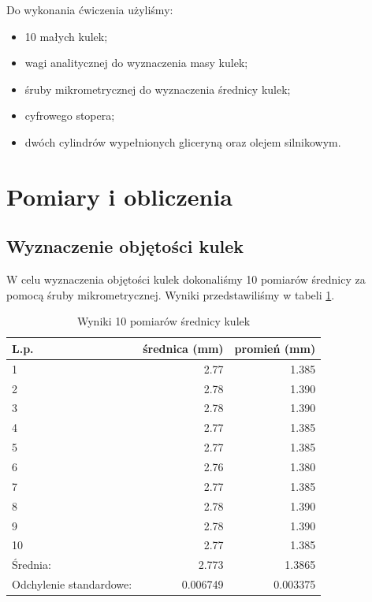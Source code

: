 \documentclass[a4paper]{article}
\begin{document}
Do wykonania ćwiczenia użyliśmy:

\begin{itemize}
	\item 10 małych kulek;
	\item wagi analitycznej do wyznaczenia masy kulek;
	\item śruby mikrometrycznej do wyznaczenia średnicy kulek;
	\item cyfrowego stopera;
	\item dwóch cylindrów wypełnionych gliceryną oraz olejem silnikowym.
\end{itemize}

\section{Pomiary i obliczenia}

\subsection{Wyznaczenie objętości kulek}

W celu wyznaczenia objętości kulek dokonaliśmy 10 pomiarów średnicy za pomocą śruby mikrometrycznej.
Wyniki przedstawiliśmy w tabeli \ref{kulki_srednica}.

\begin{table}[h!]
	\centering
	\begin{tabular}{lrr}
		\toprule
		L.p. &  średnica (mm) &  promień (mm) \\
		\midrule
		1 &           2.77 &         1.385 \\
		2 &           2.78 &         1.390 \\
		3 &           2.78 &         1.390 \\
		4 &           2.77 &         1.385 \\
		5 &           2.77 &         1.385 \\
		6 &           2.76 &         1.380 \\
		7 &           2.77 &         1.385 \\
		8 &           2.78 &         1.390 \\
		9 &           2.78 &         1.390 \\
		10 &           2.77 &         1.385 \\
		\midrule
		Średnia: & 2.773 & 1.3865 \\
		Odchylenie standardowe: & 0.006749 & 0.003375 \\
		\bottomrule
	\end{tabular}
	\caption{Wyniki 10 pomiarów średnicy kulek}
	\label{kulki_srednica}
\end{table}
\end{document}
